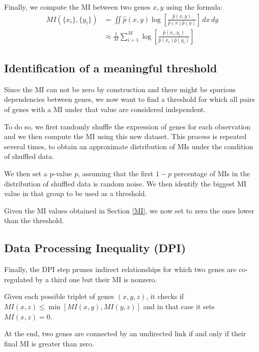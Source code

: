 Finally, we compute the MI between two genes $x, y$ using the formula:
\begin{align*}
    \mathit{MI}(\{ x_i \}, \{ y_i \}) & = \iint \hat{p}(x, y) \log [\frac{\hat{p}(x, y)}{\hat{p}(x) \hat{p}(y)}] \, dx \, dy          \\
                                      & \approx \frac{1}{M} \sum_{i=1}^{M} \log [\frac{\hat{p}(x_i, y_i)}{\hat{p}(x_i) \hat{p}(y_i)}]
\end{align*}

\subsection{Identification of a meaningful threshold} \label{threshold-aracne}
Since the MI can not be zero by construction
and there might be spurious dependencies between genes,
we now want to find a threshold for which
all pairs of genes with a MI under that value are considered independent.

To do so, we first randomly shuffle the expression of genes for each observation
and we then compute the MI using this new dataset.
This process is repeated several times,
to obtain an approximate distribution of MIs under the condition of shuffled data.

We then set a p-value $p$, assuming that the first $1-p$ percentage of
MIs in the distribution of shuffled data is random noise.
We then identify the biggest MI value in that group to be used as a threshold.

Given the MI values obtained in Section \ref{MI},
we now set to zero the ones lower than the threshold.

\subsection{Data Processing Inequality (DPI)}
Finally, the DPI step prunes indirect relationships for which two
genes are co-regulated by a third one but their MI is nonzero.

Given each possible triplet of genes $(x, y, z)$,
it checks if $\mathit{MI}(x, z) \leq \min[\mathit{MI}(x, y), \mathit{MI}(y, z)]$
and in that case it sets $\mathit{MI}(x, z) = 0$.

At the end, two genes are connected by an undirected link if and only if
their final MI is greater than zero.